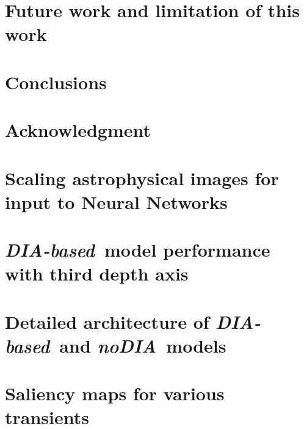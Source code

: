 \documentclass[linenumbers, twocolumn]{aastex631}
\newcommand{\tatiana}[1]{{\color{orange} #1}}
\newcommand{\nodia}{{\it noDIA}}
\newcommand{\diabased}{{\it DIA-based}}
\begin{document}
\section{Future work and limitation of this work}\label{sec:futurework}

\section{Conclusions}\label{sec:conclusion}


\clearpage
\section{Acknowledgment}\label{sec:thanks}


{}

% 
%  
\appendix 
\onecolumngrid 
\section{Scaling astrophysical images for input to Neural Networks}
\label{sec:appendixa}


\tatiana{\section{\diabased\ model performance with third depth axis}
\label{sec:appendix3channel}
}


\section{Detailed architecture of \diabased\ and \nodia\ models}
\label{sec:appendixb}

%
\clearpage

\section{Saliency maps for various transients}

\label{sec:appendixc}

%
\end{document}
